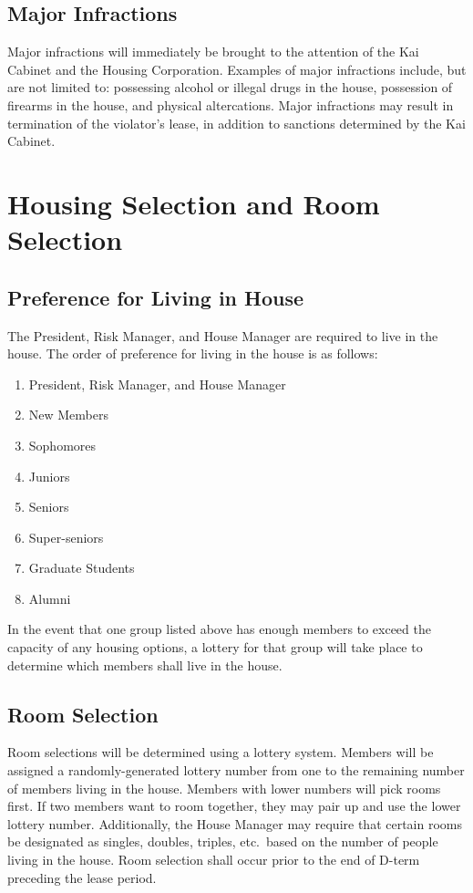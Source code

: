 \subsection{Major Infractions}

Major infractions will immediately be brought to the attention of the Kai
Cabinet and the Housing Corporation.
Examples of major infractions include, but are not limited to: possessing
alcohol or illegal drugs in the house, possession of firearms in the house, and
physical altercations.
Major infractions may result in termination of the violator’s lease, in
addition to sanctions determined by the Kai Cabinet.

\section{Housing Selection and Room Selection}

\subsection{Preference for Living in House}

The President, Risk Manager, and House Manager are required to live in the
house.
The order of preference for living in the house is as follows:
\begin{enumerate}
    \item President, Risk Manager, and House Manager
    \item New Members
    \item Sophomores
    \item Juniors
    \item Seniors
    \item Super-seniors
    \item Graduate Students
    \item Alumni
\end{enumerate}

In the event that one group listed above has enough members to exceed the
capacity of any housing options, a lottery for that group will take place to
determine which members shall live in the house.

\subsection{Room Selection}

Room selections will be determined using a lottery system.
Members will be assigned a randomly-generated lottery number from one to the
remaining number of members living in the house.
Members with lower numbers will pick rooms first.
If two members want to room together, they may pair up and use the lower
lottery number.
Additionally, the House Manager may require that certain rooms be designated as
singles, doubles, triples, etc.\ based on the number of people living in the
house.
Room selection shall occur prior to the end of D-term preceding the lease
period.

